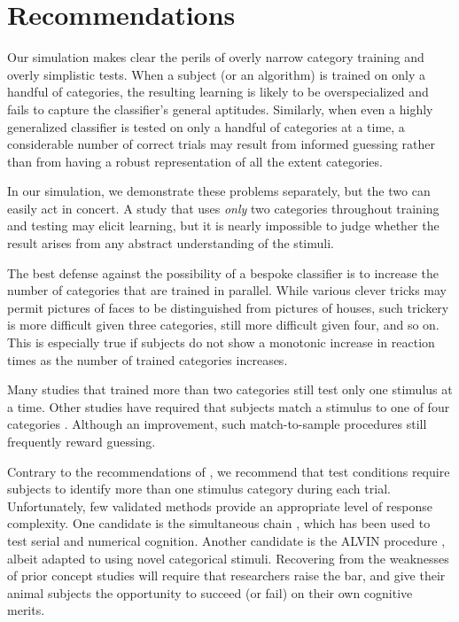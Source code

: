 \documentclass[fleqn,10pt]{wlpeerj_noabs}
\begin{document}
\section*{Recommendations}

Our simulation makes clear the perils of overly narrow category training and overly simplistic tests. When a subject (or an algorithm) is trained on only a handful of categories, the resulting learning is likely to be overspecialized and fails to capture the classifier's general aptitudes. Similarly, when even a highly generalized classifier is tested on only a handful of categories at a time, a considerable number of correct trials may result from informed guessing rather than from having a robust representation of all the extent categories.

In our simulation, we demonstrate these problems separately, but the two can easily act in concert. A study that uses \textsl{only} two categories throughout training and testing may elicit learning, but it is nearly impossible to judge whether the result arises from any abstract understanding of the stimuli. 

The best defense against the possibility of a bespoke classifier is to increase the number of categories that are trained in parallel. While various clever tricks may permit pictures of faces to be distinguished from pictures of houses, such trickery is more difficult given three categories, still more difficult given four, and so on. This is especially true if subjects do not show a monotonic increase in reaction times as the number of trained categories increases.

Many studies that trained more than two categories \citep[e.g.][]{Herr1976, Siga2009, Vonk2013} still test only one stimulus at a time. Other studies have required that subjects match a stimulus to one of four categories \citep{Bhat1988, Laza2004}. Although an improvement, such match-to-sample procedures still frequently reward guessing.

Contrary to the recommendations of \citet{Katz2007}, we recommend that test conditions require subjects to identify more than one stimulus category during each trial. Unfortunately, few validated methods provide an appropriate level of response complexity. One candidate is the simultaneous chain \citep{Terr2005}, which has been used to test serial and numerical cognition. Another candidate is the ALVIN procedure \citep{Wash1995}, albeit adapted to using novel categorical stimuli. Recovering from the weaknesses of prior concept studies will require that researchers raise the bar, and give their animal subjects the opportunity to succeed (or fail) on their own cognitive merits.
\end{document}
